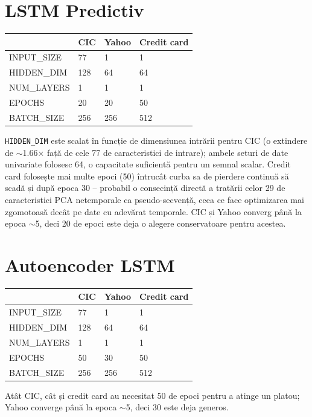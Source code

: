 \section{LSTM Predictiv}

\begin{center}
\begin{tabular}{@{}llll@{}}
\toprule
 & CIC & Yahoo & Credit card \\
\midrule
INPUT\_SIZE & 77 & 1 & 1 \\
HIDDEN\_DIM & 128 & 64 & 64 \\
NUM\_LAYERS & 1 & 1 & 1 \\
EPOCHS & 20 & 20 & 50 \\
BATCH\_SIZE & 256 & 256 & 512 \\
\bottomrule
\end{tabular}
\end{center}

\texttt{HIDDEN\_DIM} este scalat în funcție de dimensiunea intrării pentru CIC (o extindere de $\sim$1.66$\times$ față de cele 77 de caracteristici de intrare); ambele seturi de date univariate folosesc 64, o capacitate suficientă pentru un semnal scalar. Credit card folosește mai multe epoci (50) întrucât curba sa de pierdere continuă să scadă și după epoca 30 -- probabil o consecință directă a tratării celor 29 de caracteristici PCA netemporale ca pseudo-secvență, ceea ce face optimizarea mai zgomotoasă decât pe date cu adevărat temporale. CIC și Yahoo converg până la epoca $\sim$5, deci 20 de epoci este deja o alegere conservatoare pentru acestea.

\section{Autoencoder LSTM}

\begin{center}
\begin{tabular}{llll}
\toprule
 & CIC & Yahoo & Credit card \\
\midrule
INPUT\_SIZE & 77 & 1 & 1 \\
HIDDEN\_DIM & 128 & 64 & 64 \\
NUM\_LAYERS & 1 & 1 & 1 \\
EPOCHS & 50 & 30 & 50 \\
BATCH\_SIZE & 256 & 256 & 512 \\
\bottomrule
\end{tabular}
\end{center}

Atât CIC, cât și credit card au necesitat 50 de epoci pentru a atinge un platou; Yahoo converge până la epoca $\sim$5, deci 30 este deja generos.

